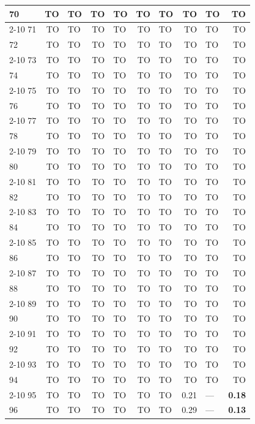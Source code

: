\begin{longtable}{lr@{\hskip 4pt}l@{\hskip 12pt}r@{\hskip 4pt}l@{\hskip 12pt}r@{\hskip 4pt}l@{\hskip 12pt}r@{\hskip 4pt}l@{\hskip 12pt}r}
70 & TO & TO & TO & TO & TO & TO & TO & TO & TO \\
\cmidrule{2-10}
71 & TO & TO & TO & TO & TO & TO & TO & TO & TO \\
72 & TO & TO & TO & TO & TO & TO & TO & TO & TO \\
\cmidrule{2-10}
73 & TO & TO & TO & TO & TO & TO & TO & TO & TO \\
74 & TO & TO & TO & TO & TO & TO & TO & TO & TO \\
\cmidrule{2-10}
75 & TO & TO & TO & TO & TO & TO & TO & TO & TO \\
76 & TO & TO & TO & TO & TO & TO & TO & TO & TO \\
\cmidrule{2-10}
77 & TO & TO & TO & TO & TO & TO & TO & TO & TO \\
78 & TO & TO & TO & TO & TO & TO & TO & TO & TO \\
\cmidrule{2-10}
79 & TO & TO & TO & TO & TO & TO & TO & TO & TO \\
80 & TO & TO & TO & TO & TO & TO & TO & TO & TO \\
\cmidrule{2-10}
81 & TO & TO & TO & TO & TO & TO & TO & TO & TO \\
82 & TO & TO & TO & TO & TO & TO & TO & TO & TO \\
\cmidrule{2-10}
83 & TO & TO & TO & TO & TO & TO & TO & TO & TO \\
84 & TO & TO & TO & TO & TO & TO & TO & TO & TO \\
\cmidrule{2-10}
85 & TO & TO & TO & TO & TO & TO & TO & TO & TO \\
86 & TO & TO & TO & TO & TO & TO & TO & TO & TO \\
\cmidrule{2-10}
87 & TO & TO & TO & TO & TO & TO & TO & TO & TO \\
88 & TO & TO & TO & TO & TO & TO & TO & TO & TO \\
\cmidrule{2-10}
89 & TO & TO & TO & TO & TO & TO & TO & TO & TO \\
90 & TO & TO & TO & TO & TO & TO & TO & TO & TO \\
\cmidrule{2-10}
91 & TO & TO & TO & TO & TO & TO & TO & TO & TO \\
92 & TO & TO & TO & TO & TO & TO & TO & TO & TO \\
\cmidrule{2-10}
93 & TO & TO & TO & TO & TO & TO & TO & TO & TO \\
94 & TO & TO & TO & TO & TO & TO & TO & TO & TO \\
\cmidrule{2-10}
95 & TO & TO & TO & TO & TO & TO & 0.21 & --- & \textbf{0.18} \\
96 & TO & TO & TO & TO & TO & TO & 0.29 & --- & \textbf{0.13} \\

\end{longtable}
